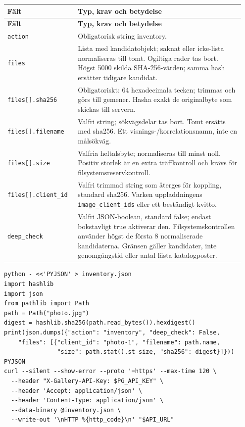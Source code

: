 \documentclass[11pt,a4paper]{article}
\newcommand{\codeword}[1]{\nolinkurl{#1}}
\begin{document}
\begin{longtable}{@{}>{\RaggedRight\arraybackslash}p{0.28\linewidth}>{\RaggedRight\arraybackslash}p{0.67\linewidth}@{}}
\toprule
\textbf{Fält} & \textbf{Typ, krav och betydelse} \\
\midrule
\endfirsthead
\toprule
\textbf{Fält} & \textbf{Typ, krav och betydelse} \\
\midrule
\endhead
\bottomrule
\endfoot
\codeword{action} & Obligatorisk string inventory. \\
\codeword{files} & Lista med kandidatobjekt; saknat eller icke-lista normaliseras till tomt.
Ogiltiga rader tas bort. Högst 5000 skilda SHA-256-värden; samma hash ersätter tidigare
kandidat. \\
\codeword{files[].sha256} & Obligatoriskt: 64 hexadecimala tecken; trimmas och görs till
gemener. Hasha exakt de originalbyte som skickas till servern. \\
\codeword{files[].filename} & Valfri string; sökvägsdelar tas bort. Tomt ersätts med sha256.
Ett visnings-/korrelationsnamn, inte en målsökväg. \\
\codeword{files[].size} & Valfria heltalsbyte; normaliseras till minst noll. Positiv storlek
är en extra träffkontroll och krävs för filsystemsreservkontroll. \\
\codeword{files[].client_id} & Valfri trimmad string som återges för koppling, standard
sha256. Varken uppladdningens \codeword{image_client_ids} eller ett beständigt kvitto. \\
\codeword{deep_check} & Valfri JSON-boolean, standard false; endast bokstavligt true
aktiverar den. Filsystemskontrollen använder högst de första 8 normaliserade kandidaterna.
Gränsen gäller kandidater, inte genomgångstid eller antal lästa katalogposter. \\
\end{longtable}

\begin{lstlisting}[language={}]
python - <<'PYJSON' > inventory.json
import hashlib
import json
from pathlib import Path
path = Path("photo.jpg")
digest = hashlib.sha256(path.read_bytes()).hexdigest()
print(json.dumps({"action": "inventory", "deep_check": False,
    "files": [{"client_id": "photo-1", "filename": path.name,
               "size": path.stat().st_size, "sha256": digest}]}))
PYJSON
curl --silent --show-error --proto '=https' --max-time 120 \
  --header "X-Gallery-API-Key: $PG_API_KEY" \
  --header 'Accept: application/json' \
  --header 'Content-Type: application/json' \
  --data-binary @inventory.json \
  --write-out '\nHTTP %{http_code}\n' "$API_URL"
\end{lstlisting}
\end{document}
